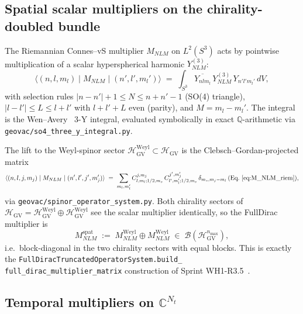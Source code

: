 \documentclass[11pt,a4paper]{article}
\theoremstyle{plain}
\theoremstyle{definition}
\newcommand{\nmax}{n_{\max}}
\newcommand{\Nt}{N_t}
\newcommand{\sthree}{S^{3}}
\newcommand{\Bcal}{\mathcal{B}}
\newcommand{\C}{\mathbb{C}}
\newcommand{\Q}{\mathbb{Q}}
\newcommand{\HGV}{\mathcal{H}_{\mathrm{GV}}}
\newcommand{\spat}{\mathrm{spat}}
\newcommand{\Weyl}{\mathrm{Weyl}}
\begin{document}
\subsection{Spatial scalar multipliers on the chirality-doubled bundle}
\label{sec:spat_mult}

The Riemannian Connes--vS multiplier $M_{NLM}$ on $L^2(\sthree)$
acts by pointwise multiplication of a scalar hyperspherical harmonic
$Y^{(3)}_{NLM}$:\
\begin{equation}\label{eq:M_NLM_riem}
   \langle (n,l,m_l) \mid M_{NLM} \mid (n', l', m_l') \rangle
   \;=\; \int_{\sthree}
           \overline{Y_{n l m_l}}\, Y^{(3)}_{NLM}\, Y_{n' l' m_l'}\, dV,
\end{equation}
with selection rules $|n - n'| + 1 \le N \le n + n' - 1$ (SO(4)
triangle), $|l - l'| \le L \le l + l'$ with $l + l' + L$ even
(parity), and $M = m_l - m_l'$. The integral is the
Wen--Avery~\cite{avery_wen_avery2002} 3-Y integral, evaluated
symbolically in exact $\Q$-arithmetic via
\texttt{geovac/so4\_three\_y\_integral.py}.

The lift to the Weyl-spinor sector $\HGV^{\Weyl} \subset \HGV$ is
the Clebsch--Gordan-projected matrix
\begin{equation}\label{eq:M_NLM_weyl}
   \langle (n, l, j, m_j) \mid M_{NLM} \mid
            (n', l', j', m_j') \rangle
   \;=\; \sum_{m_l, m_l'} C^{j, m_j}_{l, m_l; 1/2, m_s}
                     \, C^{j', m_j'}_{l', m_l'; 1/2, m_s}
                     \, \delta_{m_s, m_j - m_l}\,
                       (\text{Eq.}~\eqref{eq:M_NLM_riem}),
\end{equation}
via \texttt{geovac/spinor\_operator\_system.py}. Both chirality
sectors of $\HGV = \HGV^{\Weyl} \oplus \HGV^{\Weyl}$ see the
scalar multiplier identically, so the FullDirac multiplier is
\begin{equation}\label{eq:M_NLM_full}
   M^{\spat}_{NLM} \;:=\; M^{\Weyl}_{NLM} \oplus M^{\Weyl}_{NLM}
   \;\in\; \Bcal(\HGV^{\nmax}),
\end{equation}
i.e.\ block-diagonal in the two chirality sectors with equal blocks.
This is exactly the \texttt{FullDiracTruncatedOperatorSystem.build\_%
full\_dirac\_multiplier\_matrix} construction of
Sprint WH1-R3.5~\cite{paper32}.

\subsection{Temporal multipliers on $\C^{\Nt}$}\label{sec:temp_mult}
\end{document}
